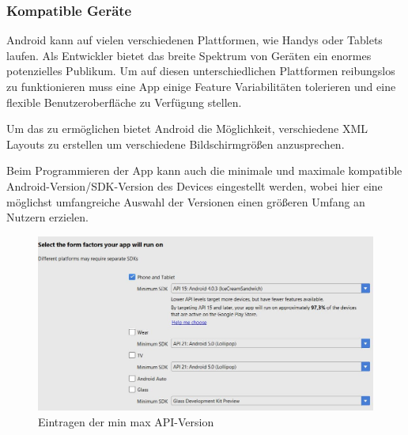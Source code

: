 \subsubsection{Kompatible Geräte}
\label{subsec:device-compability}

Android kann auf vielen verschiedenen Plattformen, wie Handys oder Tablets laufen.
Als Entwickler bietet das breite Spektrum von Geräten ein enormes potenzielles Publikum.
Um auf diesen unterschiedlichen Plattformen reibungslos zu funktionieren muss eine App einige Feature Variabilitäten tolerieren und eine 
flexible Benutzeroberfläche zu Verfügung stellen. 

Um das zu ermöglichen bietet Android die Möglichkeit, verschiedene XML Layouts zu erstellen um verschiedene Bildschirmgrößen anzusprechen.

Beim Programmieren der App kann auch die minimale und maximale kompatible Android-Version/SDK-Version des Devices eingestellt werden, wobei hier eine möglichst umfangreiche Auswahl der Versionen einen größeren Umfang an Nutzern erzielen.

\begin{figure}[!htb]\centering
	\includegraphics[width=1.0 \textwidth]{images/MinMaxVers}
	\caption{Eintragen der min max API-Version}\label{Fig:min-max Version}
\end{figure}




\clearpage %